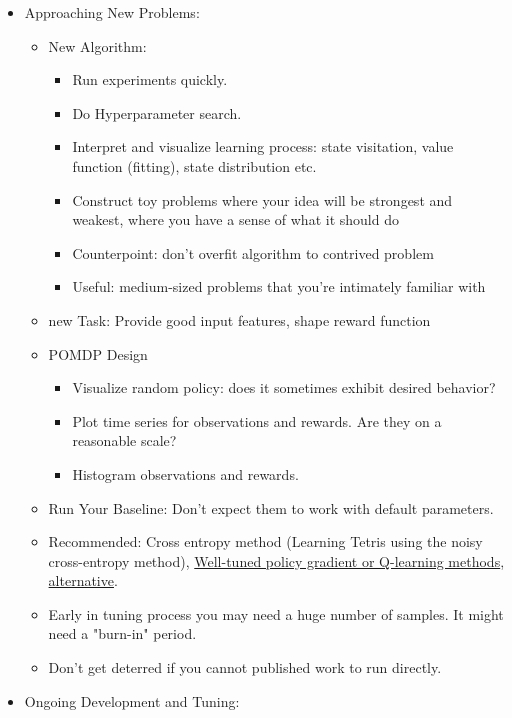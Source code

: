 \begin{itemize}[noitemsep,nolistsep]
	\item Approaching New Problems:
	\begin{itemize}[noitemsep,nolistsep]
		\item New Algorithm:
		\begin{itemize}[noitemsep,nolistsep]
			\item Run experiments quickly.
			\item Do Hyperparameter search.
			\item Interpret and visualize learning process: state visitation, value function (fitting), state distribution etc.
			\item Construct toy problems where your idea will be strongest and weakest, where you have a sense of what it should do
			\item Counterpoint: don't overfit algorithm to contrived problem
			\item Useful: medium-sized problems that you're intimately familiar with
		\end{itemize}
		\item new Task: Provide good input features, shape reward function
		\item POMDP Design
		\begin{itemize}[noitemsep,nolistsep]
			\item Visualize random policy: does it sometimes exhibit desired behavior?
			\item Plot time series for observations and rewards. Are they on a reasonable scale?
			\item Histogram observations and rewards.
		\end{itemize}
		\item Run Your Baseline: Don't expect them to work with default parameters.
		\item Recommended: Cross entropy method (Learning Tetris using the noisy cross-entropy method), \href{https://github.com/openai/baselines}{Well-tuned policy gradient or Q-learning methods}, \href{https://github.com/rll/rllab}{alternative}.
		\item Early in tuning process you may need a huge number of samples. It might need a "burn-in" period.
		\item Don't get deterred if you cannot published work to run directly.
	\end{itemize}
	\item Ongoing Development and Tuning:
	\begin{itemize}

\end{itemize}
\end{itemize}
